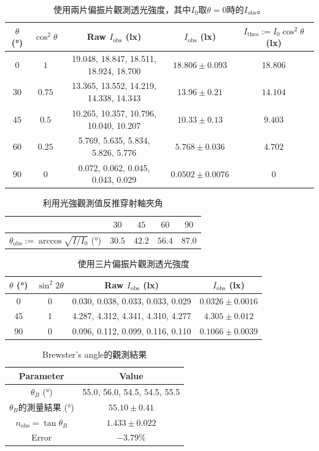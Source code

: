\begin{table}[htb!]
\centering
\caption{使用兩片偏振片觀測透光強度，其中$I_{0}$取$\theta=0$時的$I_{\text{obs}}$。}
\begin{tabular}{ccccc}
\toprule
$\theta$ (\unit{\degree}) & $\cos^{2}\theta$ & Raw $I_{\text{obs}}$ (\unit{\lux}) & $I_{\text{obs}}$ (\unit{\lux}) & $I_{\text{theo}}:=I_{0}\cos^{2}\theta$ (\unit{\lux}) \\
\midrule
$0$ & $1$ & 19.048, 18.847, 18.511, 18.924, 18.700 & $18.806 \pm 0.093$ & $18.806$ \\
$30$ & $0.75$ & 13.365, 13.552, 14.219, 14.338, 14.343 & $13.96 \pm 0.21$ & $14.104$ \\
$45$ & $0.5$ & 10.265, 10.357, 10.796, 10.040, 10.207 & $10.33 \pm 0.13$ & $9.403$ \\
$60$ & $0.25$ & 5.769, 5.635, 5.834, 5.826, 5.776 & $5.768 \pm 0.036$ & $4.702$ \\
$90$ & $0$ & 0.072, 0.062, 0.045, 0.043, 0.029 & $0.0502 \pm 0.0076$ & $0$ \\
\bottomrule
\end{tabular}
\end{table}
\begin{table}[htb!]
\centering
\caption{利用光強觀測值反推穿射軸夾角}
\begin{tabular}{ccccc}
\toprule
  & $30$ & $45$ & $60$ & $90$ \\
\midrule
$\theta_{\text{obs}}:=\arccos\sqrt{I/I_{0}}$ (\unit{\degree}) & $30.5$ & $42.2$ & $56.4$ & $87.0$ \\
\bottomrule
\end{tabular}
\end{table}
\begin{table}[htb!]
\centering
\caption{使用三片偏振片觀測透光強度}
\begin{tabular}{cccc}
\toprule
$\theta$ (\unit{\degree}) & $\sin^{2}2\theta$ & Raw $I_{\text{obs}}$ (\unit{\lux}) & $I_{\text{obs}}$ (\unit{\lux}) \\
\midrule
$0$ & $0$ & 0.030, 0.038, 0.033, 0.033, 0.029 & $0.0326 \pm 0.0016$ \\
$45$ & $1$ & 4.287, 4.312, 4.341, 4.310, 4.277 & $4.305 \pm 0.012$ \\
$90$ & $0$ & 0.096, 0.112, 0.099, 0.116, 0.110 & $0.1066 \pm 0.0039$ \\
\bottomrule
\end{tabular}
\end{table}
\begin{table}[htb!]
\centering
\caption{Brewster's angle的觀測結果}
\begin{tabular}{cc}
\toprule
Parameter & Value \\
\midrule
$\theta_{B}$ (\unit{\degree}) & 55.0, 56.0, 54.5, 54.5, 55.5 \\
$\theta_{B}$的測量結果 (\unit{\degree}) & $55.10 \pm 0.41$ \\
$n_{\text{obs}}=\tan\theta_{B}$ & $1.433 \pm 0.022$ \\
Error & $-3.79\%$ \\
\bottomrule
\end{tabular}
\end{table}
